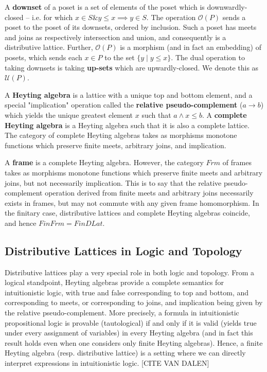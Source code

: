 \documentclass[hoptionsi,review,format=acmsmall]{acmart}
\theoremstyle{definition}
\newcommand{\Oc}{\mathcal{O}}
\newcommand{\Uc}{\mathcal{U}}
\newcommand{\band}{\mathbin{\&}}
\begin{document}
A \textbf{downset} of a poset is a set of elements of the poset which is downwardly-closed -- i.e. for which \(x \in S \band y \le x \implies y \in S\). The operation \(\Oc(P)\) sends a poset to the poset of its downsets, ordered by inclusion. Such a poset has meets and joins as respectively intersection and union, and consequently is a distributive lattice. Further, \(\Oc(P)\) is a morphism (and in fact an embedding) of posets, which sends each \(x \in P\) to the set \(\{y \mathbin{|} y \le x\}\). The dual operation to taking downsets is taking \textbf{up-sets}  which are upwardly-closed. We denote this as \(\Uc(P)\).

A \textbf{Heyting algebra} is a lattice with a unique top and bottom element, and a special "implication" operation called the \textbf{relative pseudo-complement} (\(a \rightarrow b\)) which yields the unique greatest element \(x\) such that \(a \wedge x \le b\). A \textbf{complete Heyting algebra} is a Heyting algebra such that it is also a complete lattice. The category of complete Heyting algebras takes as morphisms monotone functions which preserve finite meets, arbitrary joins, and implication.

A \textbf{frame} is a complete Heyting algebra. However, the category \(Frm\) of frames takes as morphisms monotone functions which preserve finite meets and arbitrary joins, but not necessarily implication. This is to say that the relative pseudo-complement operation derived from finite meets and arbitrary joins necessarily exists in frames, but may not commute with any given frame homomorphism. In the finitary case, distributive lattices and complete Heyting algebras coincide, and hence \(FinFrm = FinDLat\).

\subsection{Distributive Lattices in Logic and Topology}

Distributive lattices play a very special role in both logic and topology. From a logical standpoint, Heyting algebras provide a complete semantics for intuitionistic logic, with true and false corresponding to top and bottom, and corresponding to meets, or corresponding to joins, and implication being given by the relative pseudo-complement. More precisely, a formula in intuitionistic propositional logic is provable (tautological) if and only if it is valid (yields true under every assignment of variables) in every Heyting algebra (and in fact this result holds even when one considers only finite Heyting algebras). Hence, a finite Heyting algebra (resp. distributive lattice) is a setting where we can directly interpret expressions in intuitionistic logic. [CITE VAN DALEN]
\end{document}
